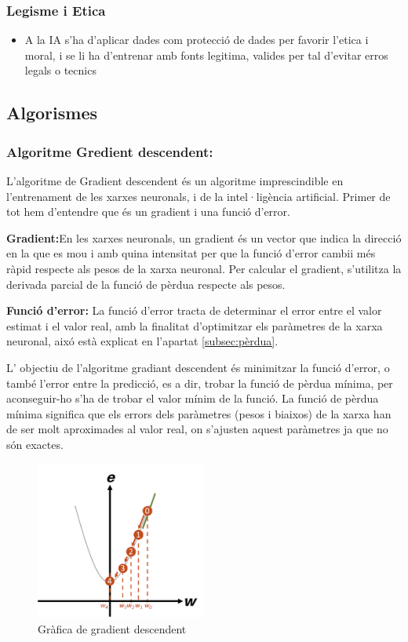 \subsubsection{Legisme i Etica}
\begin{itemize}
 \item A la IA s'ha d'aplicar dades com protecció de dades per favorir l'etica i moral, i se li ha d'entrenar amb fonts legitima, valides per tal d'evitar erros legals o tecnics
\end{itemize}


\subsection{Algorismes}\label{subsec:Algorismes}
\subsubsection{Algoritme Gredient descendent:}\label{subsec:gradient}
L'algoritme de Gradient descendent és un algoritme imprescindible en l'entrenament de les xarxes neuronals, i de la intel·ligència artificial. Primer de tot hem d'entendre que és un gradient i una funció d'error.

\textbf{Gradient:}En les xarxes neuronals, un gradient és un vector que indica la direcció en la que es mou i amb quina intensitat per que la funció d'error cambii més ràpid respecte als pesos de la xarxa neuronal. Per calcular el gradient, s'utilitza la derivada parcial de la funció de pèrdua respecte als pesos.

\textbf{Funció d'error:} La funció d'error tracta de determinar el error entre el valor estimat i el valor real, amb la finalitat d'optimitzar els paràmetres de la xarxa neuronal, aixó està explicat en l'apartat \ref{subsec:pèrdua}.

L' objectiu de l'algoritme gradiant descendent és minimitzar la funció d'error, o també l'error entre la predicció, es a dir, trobar la funció de pèrdua mínima, per aconseguir-ho s'ha de trobar el valor mínim de la funció. La funció de pèrdua mínima significa que els errors dels paràmetres (pesos i biaixos) de la xarxa han de ser molt aproximades al valor real, on s'ajusten aquest paràmetres ja que no són exactes.

\begin{figure}[H]
    \centering
    \includegraphics[width=0.5\textwidth]{./figures/gradient_descendent.png}
    \caption{Gràfica de gradient descendent}
\end{figure}

